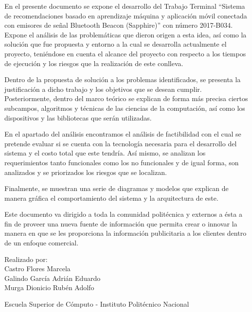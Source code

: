 En el presente documento se expone el desarrollo del Trabajo Terminal ``Sistema de recomendaciones basado en aprendizaje máquina y aplicación móvil conectada con emisores de señal Bluetooth Beacon (Sapphire)''  con número 2017-B034. Expone el análisis de las problemáticas que dieron origen a esta idea, así como la solución que fue propuesta y entorno a la cual se desarrolla actualmente el proyecto, teniéndose en cuenta el alcance del proyecto con respecto a los tiempos de ejecución y los riesgos que la realización de este conlleva.
\\ \par
Dentro de la propuesta de solución a los problemas identificados, se presenta la justificación a dicho trabajo y los objetivos que se desean cumplir.
Posteriormente, dentro del marco teórico se explican de forma más precisa ciertos subcampos, algoritmos y técnicas de las ciencias de la computación, así como los dispositivos y las bibliotecas que serán utilizadas.
\\ \par
En el apartado del análisis encontramos el análisis de factibilidad con el cual se pretende evaluar si se cuenta con la tecnología necesaria para el desarrollo del sistema y el costo total que este tendría. Así mismo, se analizan los requerimientos tanto funcionales como los no funcionales y de igual forma, son analizados y se priorizados los riesgos que se  localizan.
\\ \par
Finalmente, se muestran una serie de diagramas y modelos que explican de manera gráfica el comportamiento del sistema y la arquitectura de este.
\\ \par
Este documento va dirigido a toda la comunidad politécnica y externos a ésta a fin de proveer una nueva fuente de información que permita crear o innovar la manera en que se les proporciona la información publicitaria a los clientes dentro de un enfoque comercial.
\\ \par


Realizado por:\\
Castro Flores Marcela\\
Galindo García Adrián Eduardo\\
Murga Dionicio Rubén Adolfo 
\\ \par

Escuela Superior de Cómputo - Instituto Politécnico Nacional
\\ \par
